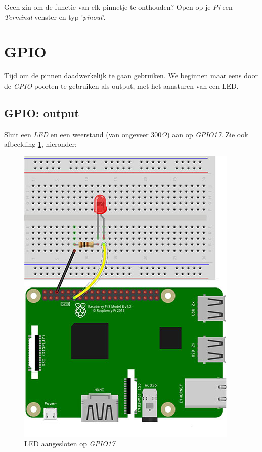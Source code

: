 \begin{exercise}
Geen zin om de functie van elk pinnetje te onthouden? Open op je \textit{Pi} een \textit{Terminal}-venster en typ '\textit{pinout}'.
\end{exercise}

\newpage

\section{GPIO}
Tijd om de pinnen daadwerkelijk te gaan gebruiken. We beginnen maar eens door de \textit{GPIO}-poorten te gebruiken als output, met het aansturen van een LED.
\subsection{GPIO: output}
Sluit een \textit{LED} en een weerstand (van ongeveer $300 \Omega$) aan op \textit{GPIO17}. Zie ook afbeelding \ref{fig:pi_led}, hieronder:
\begin{figure}[h!]
\centering\includegraphics[scale=0.45]{Pictures/chapter05/pi_led_01.jpg}
\caption{LED aangesloten op \textit{GPIO17}}
\label{fig:pi_led} %
\end{figure}

